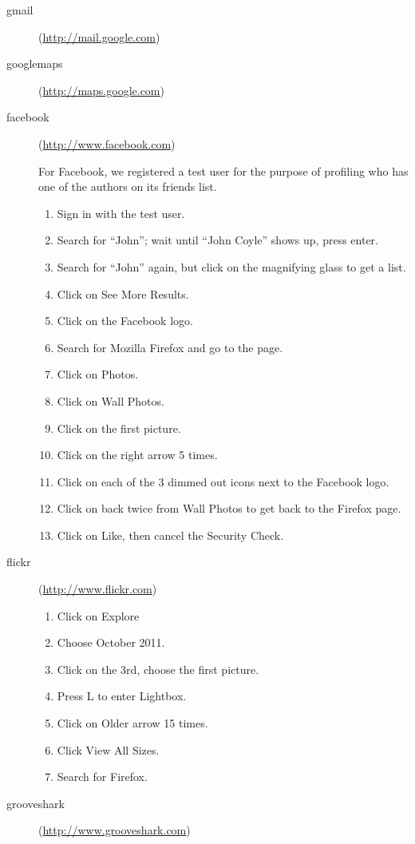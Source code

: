 \begin{description}
\item[gmail] (\url{http://mail.google.com})

\item[googlemaps] (\url{http://maps.google.com})

\item[facebook] (\url{http://www.facebook.com})

  For Facebook, we registered a test user for the purpose of profiling who has
  one of the authors on its friends list.
  \begin{enumerate}
  \item Sign in with the test user.
  \item Search for ``John''; wait until ``John Coyle'' shows up, press enter.
  \item Search for ``John'' again, but click on the magnifying glass to get a list.
  \item Click on See More Results.
  \item Click on the Facebook logo.
  \item Search for Mozilla Firefox and go to the page.
  \item Click on Photos.
  \item Click on Wall Photos.
  \item Click on the first picture.
  \item Click on the right arrow 5 times.
  \item Click on each of the 3 dimmed out icons next to the Facebook logo.
  \item Click on back twice from Wall Photos to get back to the Firefox page.
  \item Click on Like, then cancel the Security Check.
  \end{enumerate}
\item[flickr] (\url{http://www.flickr.com})

  \begin{enumerate}
  \item Click on Explore
  \item Choose October 2011.
  \item Click on the 3rd, choose the first picture.
  \item Press L to enter Lightbox.
  \item Click on Older arrow 15 times.
  \item Click View All Sizes.
  \item Search for Firefox.
  \end{enumerate}
\item[grooveshark] (\url{http://www.grooveshark.com})


\end{description}
